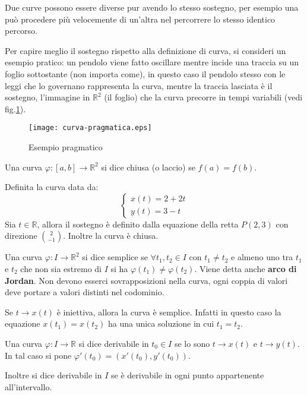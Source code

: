 Due curve possono essere diverse pur avendo lo stesso sostegno, per esempio una può procedere più velocemente di un'altra nel percorrere lo stesso identico percorso.

Per capire meglio il sostegno rispetto alla definizione di curva, si consideri un esempio pratico: un pendolo viene fatto oscillare mentre incide una traccia su un foglio sottostante (non importa come), in questo caso il pendolo stesso con le leggi che lo governano rappresenta la curva, mentre la traccia lasciata è il sostegno, l'immagine in $\mathbb{R}^2$ (il foglio) che la curva precorre in tempi variabili (vedi fig.\ref{pragmat}).
\begin{figure}[h]
	\texttt{[image: curva-pragmatica.eps]}
	\centering
	\caption{Esempio pragmatico}
	\label{pragmat}
\end{figure}


\begin{definition}
Una curva $\varphi:[a, b]\rightarrow \mathbb{R}^2$ si dice chiusa (o laccio) se $f(a)=f(b)$.
\end{definition}

\begin{example}
Definita la curva data da:
\[
	\begin{cases}
	x(t)=2+2t \\
	y(t)=3-t
	\end{cases}
\]
Sia $t\in\mathbb{R}$, allora il sostegno è definito dalla equazione della retta $P(2, 3)$ con direzione $\binom{2}{-1}$. Inoltre la curva è chiusa.
\end{example}

\begin{definition}
Una curva $\varphi:I\rightarrow \mathbb{R}^2$ si dice semplice se $\forall t_1, t_2\in I$ con $t_1\neq t_2$ e almeno uno tra $t_1$ e $t_2$ che non sia estremo di $I$ si ha $\varphi(t_1)\neq \varphi(t_2)$. Viene detta anche \textbf{arco di Jordan}. Non devono esserci sovrapposizioni nella curva, ogni coppia di valori deve portare a valori distinti nel codominio.
\end{definition}

\begin{observation}
Se $t \rightarrow x(t)$ è iniettiva, allora la curva è semplice. Infatti in questo caso la equazione $x(t_1)=x(t_2)$ ha una unica soluzione in cui $t_1=t_2$.
\end{observation}

\begin{definition}
Una curva $\varphi:I\rightarrow \mathbb{R}$ si dice derivabile in $t_0\in I$ se lo sono $t\rightarrow x(t)$ e $t \rightarrow y(t)$. In tal caso si pone $\varphi ' (t_0)=(x'(t_0), y'(t_0))$.

Inoltre si dice derivabile in $I$ se è derivabile in ogni punto appartenente all'intervallo.
\end{definition}

